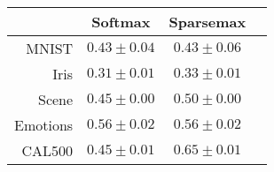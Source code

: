 \begin{tabular}{r|ccc}
& Softmax & Sparsemax \\
\hline
MNIST & $0.43 \pm 0.04$ & $0.43 \pm 0.06$ \\
Iris & $0.31 \pm 0.01$ & $0.33 \pm 0.01$ \\
Scene & $0.45 \pm 0.00$ & $0.50 \pm 0.00$ \\
Emotions & $0.56 \pm 0.02$ & $0.56 \pm 0.02$ \\
CAL500 & $0.45 \pm 0.01$ & $0.65 \pm 0.01$ \\
\end{tabular}
